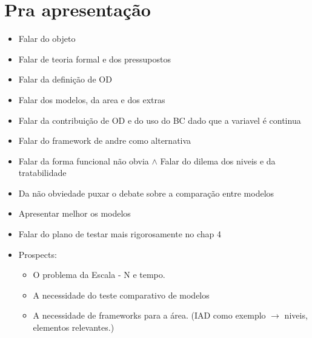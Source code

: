 \documentclass{article}
\begin{document}
\section*{Pra apresentação}

\begin{itemize}
\item Falar do objeto
\item Falar de teoria formal e dos pressupostos
\item Falar da definição de OD
\item Falar dos modelos, da area e dos extras
\item Falar da contribuição de OD e do uso do BC dado que a variavel é continua
\item Falar do framework de andre como alternativa
\item Falar da forma funcional não obvia $\land$ Falar do dilema dos niveis e da
  tratabilidade
\item Da não obviedade puxar o debate sobre a comparação entre modelos
\item Apresentar melhor os modelos
\item Falar do plano de testar mais rigorosamente no chap 4 
\item Prospects:
  \begin{itemize}
  \item  O problema da Escala  - N e tempo.
  \item A necessidade do teste comparativo de modelos
  \item A necessidade de frameworks para a área. (IAD como exemplo $\rightarrow$ niveis,
    elementos relevantes.)
  \end{itemize}
\end{itemize}
\end{document}
